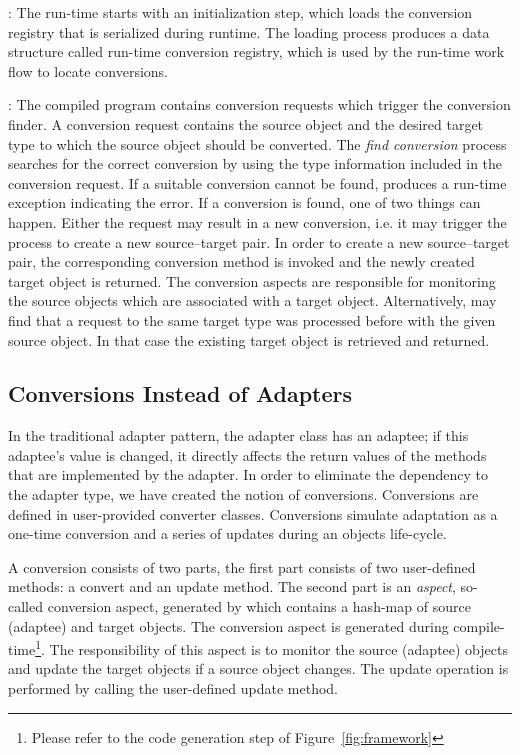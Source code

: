 \begin{description}
\item{}: The \zamk run-time starts with an initialization step, which loads the conversion registry that is serialized during runtime. 
The loading process produces a data structure called run-time conversion registry, which is used by the run-time work flow to locate conversions.
\item{}: The compiled program contains \zamk conversion requests which trigger the conversion finder. 
A conversion request contains the source object and the desired target type to which the source object should be converted. 
The \emph{find conversion} process searches for the correct conversion by using the type information included in the conversion request. 
If a suitable conversion cannot be found, \zamk produces a run-time exception indicating the error. 
If a conversion is found, one of two things can happen. Either the request may result in a new conversion, i.e. it may trigger the process to create a new source--target pair. In order to create a new source--target pair, the corresponding conversion method is invoked and the newly created target object is returned. 
The conversion aspects are responsible for monitoring the source objects which are associated with a target object. Alternatively, \zamk may find that a request to the same target type was processed before with the given source object. In that case the existing target object is retrieved and returned. 
\end{description}


\subsection{Conversions Instead of Adapters}
In the traditional adapter pattern, the adapter class has an adaptee; if this adaptee's value is changed, it directly affects the return values of the methods that are implemented by the adapter.
In order to eliminate the dependency to the adapter type, we have created the notion of conversions. 
Conversions are defined in user-provided converter classes. Conversions simulate adaptation as a one-time conversion and a series of updates during an objects life-cycle. 

A conversion consists of two parts, the first part consists of two user-defined methods: a convert and an update method. 
The second part is an \emph{aspect}, so-called conversion aspect, generated by \zamk which contains a hash-map of source (adaptee) and target objects. 
The conversion aspect is generated during compile-time\footnote{Please refer to the code generation step of Figure~\ref{fig:framework}}. 
The responsibility of this aspect is to monitor the source (adaptee) objects and update the target objects if a source object changes. 
The update operation is performed by calling the user-defined update method.

